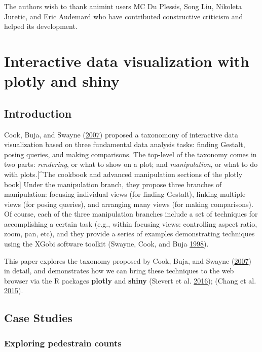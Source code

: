 \documentclass[12pt,]{isuthesis}
\begin{document}
The authors wish to thank animint users MC Du Plessis, Song Liu,
Nikoleta Juretic, and Eric Audemard who have contributed constructive
criticism and helped its development.

\chapter{Interactive data visualization with plotly and shiny}

\section{Introduction}\label{introduction-1}

Cook, Buja, and Swayne (\protect\hyperlink{ref-Cook:2007uk}{2007})
proposed a taxonomony of interactive data visualization based on three
fundamental data analysis tasks: finding Gestalt, posing queries, and
making comparisons. The top-level of the taxonomy comes in two parts:
\emph{rendering}, or what to show on a plot; and \emph{manipulation}, or
what to do with plots.{[}\^{}The cookbook and advanced manipulation
sections of the plotly book{]} Under the manipulation branch, they
propose three branches of manipulation: focusing individual views (for
finding Gestalt), linking multiple views (for posing queries), and
arranging many views (for making comparisons). Of course, each of the
three manipulation branches include a set of techniques for
accomplishing a certain task (e.g., within focusing views: controlling
aspect ratio, zoom, pan, etc), and they provide a series of examples
demonstrating techniques using the XGobi software toolkit (Swayne, Cook,
and Buja \protect\hyperlink{ref-xgobi}{1998}).

This paper explores the taxonomy proposed by Cook, Buja, and Swayne
(\protect\hyperlink{ref-Cook:2007uk}{2007}) in detail, and demonstrates
how we can bring these techniques to the web browser via the R packages
\textbf{plotly} and \textbf{shiny} (Sievert et al.
\protect\hyperlink{ref-plotly}{2016}); (Chang et al.
\protect\hyperlink{ref-shiny}{2015}).

\section{Case Studies}\label{case-studies}

\subsection{Exploring pedestrain
counts}\label{exploring-pedestrain-counts}
\end{document}
